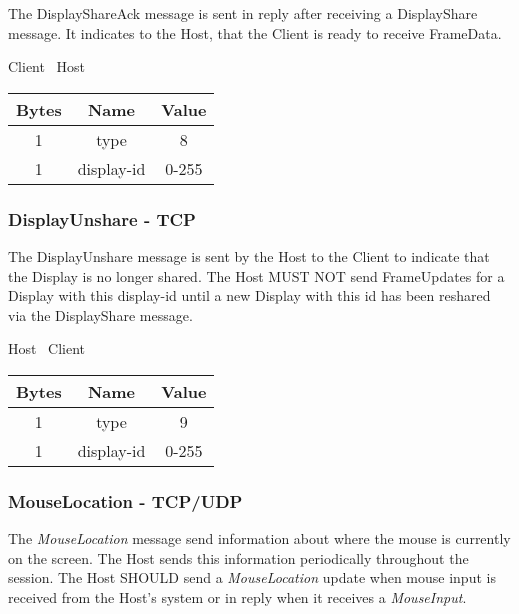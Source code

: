 The DisplayShareAck message is sent in reply after receiving a DisplayShare message.
It indicates to the Host, that the Client is ready to receive FrameData.

\begin{center}
    Client \textrightarrow\ Host\\
    \begin{tabular}{|c|c|c|}
        \hline
        \textbf{Bytes} & \textbf{Name} & \textbf{Value} \\
        \hline
        1              & type          & 8              \\
        \hline
        1              & display-id    & 0-255          \\
        \hline
    \end{tabular}
\end{center}

\subsubsection{DisplayUnshare - TCP}

The DisplayUnshare message is sent by the Host to the Client to indicate that the Display is no longer shared.
The Host MUST NOT send FrameUpdates for a Display with this display-id until a new Display with this id has been
reshared via the DisplayShare message.

\begin{center}
    Host \textrightarrow\ Client\\
    \begin{tabular}{|c|c|c|}
        \hline
        \textbf{Bytes} & \textbf{Name} & \textbf{Value} \\
        \hline
        1              & type          & 9              \\
        \hline
        1              & display-id    & 0-255          \\
        \hline
    \end{tabular}
\end{center}

\subsubsection{MouseLocation - TCP/UDP}

The \emph{MouseLocation} message send information about where the mouse is currently on the screen.
The Host sends this information periodically throughout the session.
The Host SHOULD send a \emph{MouseLocation} update when mouse input is received from the Host's system or in
reply when it receives a \emph{MouseInput}.\\

